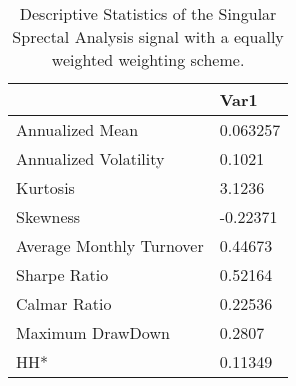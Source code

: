 \begin{table}[H]
\centering
\begin{tabular}{ll}
& Var1 \\ 
\hline 
Annualized Mean & 0.063257 \\ 
Annualized Volatility & 0.1021 \\ 
Kurtosis & 3.1236 \\ 
Skewness & -0.22371 \\ 
Average Monthly Turnover & 0.44673 \\ 
Sharpe Ratio & 0.52164 \\ 
Calmar Ratio & 0.22536 \\ 
Maximum DrawDown & 0.2807 \\ 
HH* & 0.11349 \\ 
\hline
\end{tabular}
\caption{Descriptive Statistics of the Singular Sprectal Analysis signal with a equally weighted weighting scheme.}
\label{SSA_EW}
\end{table}
